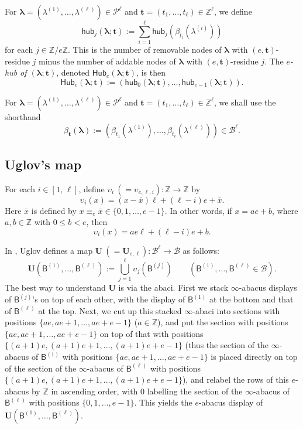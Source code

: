 \documentclass[11pt,a4paper,reqno]{amsart}
\numberwithin{equation}{section}
\theoremstyle{plain}
\theoremstyle{definition}
\theoremstyle{remark}
\numberwithin{equation}{section}
\newcommand{\bl}{\boldsymbol{\lambda}}
\newcommand{\UU}{\mathbf{U}}
\newcommand{\uu}{\upsilon}
\newcommand{\bt}{\mathbf{t}}
\newcommand{\BB}{\mathcal{B}}
\newcommand{\B}{\mathsf{B}}
\newcommand{\Hub}{\mathsf{Hub}}
\newcommand{\hub}{\mathsf{hub}}
\newcommand{\PP}{\mathcal{P}}
\def\Z{{\mathbb Z}}
\begin{document}
For $\bl = (\lambda^{(1)},\dotsc, \lambda^{(\ell)}) \in \PP^{\ell}$ and $\bt = (t_1,\dotsc, t_{\ell}) \in \Z^{\ell}$, we define
$$
\hub_j(\bl;\bt) := \sum_{i=1}^{\ell} \hub_j(\beta_{t_i}(\lambda^{(i)}))
$$
for each $j \in \Z/e\Z$.
This is the number of removable nodes of $\bl$ with $(e,\bt)$-residue $j$ minus the number of addable nodes of $\bl$ with $(e,\bt)$-residue $j$.
The {\em $e$-hub of $(\bl;\bt)$}, denoted $\Hub_e(\bl;\bt)$, is then
$$
\Hub_e(\bl;\bt) := (\hub_0(\bl;\bt), \dotsc, \hub_{e-1}(\bl;\bt)).
$$

For $\bl = (\lambda^{(1)},\dotsc, \lambda^{(\ell)}) \in \PP^{\ell}$ and $\bt = (t_1,\dotsc, t_{\ell}) \in \Z^{\ell}$, we shall use the shorthand
$$\beta_{\bt}(\bl) := (\beta_{t_1}(\lambda^{(1)}), \dotsc, \beta_{t_{\ell}}(\lambda^{(\ell)})) \in \BB^{\ell}.$$


\subsection{Uglov's map} \label{SS:Uglov}

For each $i \in [1,\,\ell]$, define $\uu_i\ (= \uu_{e,\ell, i}) : \mathbb{Z} \to \mathbb{Z}$ by
$$
\uu_i(x) = (x - \bar{x})\ell + (\ell-i)e + \bar{x}.
$$
Here $\bar{x}$ is defined by $x \equiv_e \bar{x} \in \{ 0,1,\dotsc, e-1\}$.   In other words, if $x = ae + b$, where $a,b \in \mathbb{Z}$ with $0 \leq b < e$, then $$\uu_i(x) = ae\ell + (\ell-i)e + b.$$


In \cite{Uglov}, Uglov defines a map $\UU\ (= \UU_{e,\ell}) : \BB^{\ell} \to \BB$ as follows:
$$
\UU(\B^{(1)},\dotsc,\B^{(\ell)}) := \bigcup_{j=1}^{\ell}
\uu_j(\B^{(j)}) \qquad (\B^{(1)},\dotsc, \B^{(\ell)} \in \BB).
$$
The best way to understand $\UU$ is via the abaci.
First we stack $\infty$-abacus displays of $\B^{(j)}$'s on top of each other, with the display of $\B^{(1)}$ at the bottom and that of $\B^{(\ell)}$ at the top.
Next, we cut up this stacked $\infty$-abaci into sections with positions $\{ ae, ae+1, \dotsc, ae + e-1 \}$ ($a \in \Z$), and put the section with positions $\{ ae, ae+1, \dotsc, ae + e-1 \}$ on top of that with positions $\{ (a+1)e, (a+1)e+1, \dotsc, (a+1)e + e-1 \}$ (thus the section of the $\infty$-abacus of $\B^{(1)}$ with positions $\{ ae, ae+1, \dotsc, ae + e-1 \}$ is placed directly on top of the section of the $\infty$-abacus of $\B^{(\ell)}$ with positions $\{ (a+1)e, (a+1)e+1, \dotsc, (a+1)e + e-1 \}$), and relabel the rows of this $e$-abacus by $\Z$ in ascending order, with $0$ labelling the section of the $\infty$-abacus of $\B^{(\ell)}$ with positions $\{ 0, 1, \dotsc, e-1 \}$.
This yields the $e$-abacus display of $\UU(\B^{(1)},\dotsc,\B^{(\ell)})$.
\end{document}
